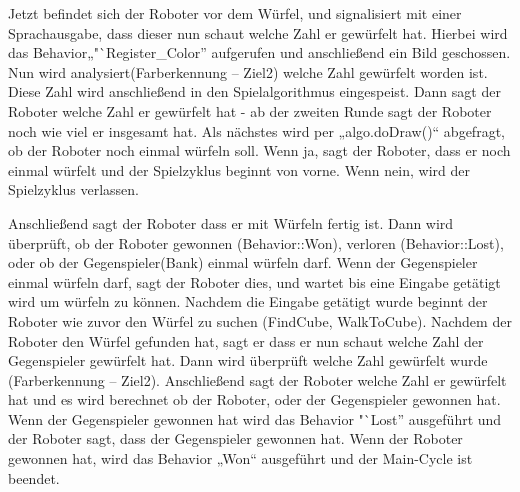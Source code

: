         Jetzt befindet sich der Roboter vor dem Würfel, und signalisiert mit
        einer Sprachausgabe, dass dieser nun schaut welche Zahl er gewürfelt
        hat.
        Hierbei wird das Behavior„"`Register\_Color'' aufgerufen und
        anschließend ein Bild geschossen.
        Nun wird analysiert(Farberkennung – Ziel2) welche Zahl gewürfelt worden
        ist.
        Diese Zahl wird anschließend in den Spielalgorithmus eingespeist.
        Dann sagt der Roboter welche Zahl er gewürfelt hat - ab der zweiten
        Runde sagt der Roboter noch wie viel er insgesamt hat.
        Als nächstes wird per „algo.doDraw()“ abgefragt, ob der Roboter noch
        einmal würfeln soll.
        Wenn ja, sagt der Roboter, dass er noch einmal würfelt und der
        Spielzyklus beginnt von vorne.
        Wenn nein, wird der Spielzyklus verlassen.

        Anschließend sagt der Roboter dass er mit Würfeln fertig ist.
        Dann wird überprüft, ob der Roboter gewonnen (Behavior::Won), verloren
        (Behavior::Lost), oder ob der Gegenspieler(Bank) einmal würfeln darf.
        Wenn der Gegenspieler einmal würfeln darf, sagt der Roboter dies, und
        wartet bis eine Eingabe getätigt wird um würfeln zu können.
        Nachdem die Eingabe getätigt wurde beginnt der Roboter wie zuvor den
        Würfel zu suchen (FindCube, WalkToCube).
        Nachdem der Roboter den Würfel gefunden hat, sagt er dass er nun schaut
        welche Zahl der Gegenspieler gewürfelt hat.
        Dann wird überprüft welche Zahl gewürfelt wurde (Farberkennung – Ziel2).
        Anschließend sagt der Roboter welche Zahl er gewürfelt hat und es wird
        berechnet ob der Roboter, oder der Gegenspieler gewonnen hat.
        Wenn der Gegenspieler gewonnen hat wird das Behavior "`Lost'' ausgeführt
        und der Roboter sagt, dass der Gegenspieler gewonnen hat.
        Wenn der Roboter gewonnen hat, wird das Behavior „Won“ ausgeführt und
        der Main-Cycle ist beendet.
